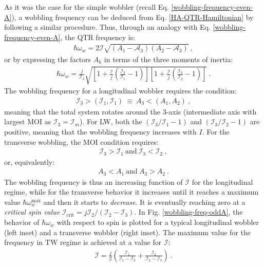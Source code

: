As it was the case for the simple wobbler (recall Eq. \ref{wobbling-frequency-even-A}), a wobbling frequency can be deduced from Eq. \ref{HA-QTR-Hamiltonian} by following a similar procedure. Thus, through an analogy with Eq. \ref{wobbling-frequency-even-A}, the QTR frequency is:
\begin{align}
    \hbar\omega_w=2\mathscr{I}\sqrt{\left(A_1-\mathscr{A}_3\right)\left(A_2-\mathscr{A}_3\right)}\ ,
    \label{wobbling-frequency-odd-A-inertiaParams}
\end{align}
or by expressing the factors $A_k$ in terms of the three moments of inertia:
\begin{align}
    \hbar\omega_w=\frac{j}{\mathcal{I}_3}\sqrt{\left[1+\frac{\mathscr{I}}{j}\left(\frac{\mathcal{I}_3}{\mathcal{I}_1}-1\right)\right]\left[1+\frac{\mathscr{I}}{j}\left(\frac{\mathcal{I}_3}{\mathcal{I}_2}-1\right)\right]}\ .
    \label{wobbling-frequency-odd-A-MOI}
\end{align}
The wobbling frequency for a longitudinal wobbler requires the condition:
\begin{align}
    \mathcal{I}_3>(\mathcal{I}_1,\mathcal{I}_1)\ \equiv\ A_3<(A_1,A_2)\ ,
\end{align}
meaning that the total system rotates around the $3$-axis (intermediate axis with largest MOI as $\mathcal{I}_3=\mathcal{I}_m$). For LW, both the $(\mathcal{I}_3/\mathcal{I}_1-1)$ and $(\mathcal{I}_3/\mathcal{I}_2-1)$ are positive, meaning that the wobbling frequency increases with $I$.
For the transverse wobbling, the MOI condition requires:
\begin{align}
    \mathcal{I}_3>\mathcal{I}_1\ \text{and}\ \mathcal{I}_3<\mathcal{I}_2\ ,
\end{align}
or, equivalently:
\begin{align}
    A_3<A_1\ \text{and}\ A_3>A_2\ .
\end{align}
The wobbling frequency is thus an increasing function of $\mathscr{I}$ for the longitudinal regime, while for the transverse behavior it increases until it reaches a maximum value $\hbar\omega_w^\text{max}$ and then it starts to \emph{decrease}. It is eventually reaching zero at a \emph{critical spin value} $\mathscr{I}_\text{crit}=j\mathcal{I}_2/(\mathcal{I}_2-\mathcal{I}_3)$. In Fig. \ref{wobbling-freq-oddA}, the behavior of $\hbar\omega_w$ with respect to spin is plotted for a typical longitudinal wobbler (left inset) and a transverse wobbler (right inset). The maximum value for the frequency in TW regime is achieved at a value for $\mathscr{I}$:
\begin{align}
    \mathscr{I}=\frac{j}{2}\left(\frac{\mathcal{I}_1}{\mathcal{I}_1-\mathcal{I}_3}+\frac{\mathcal{I}_2}{\mathcal{I}_2-\mathcal{I}_3}\right)\ .
    \label{wobb-freq-oddA-maxval}
\end{align}

